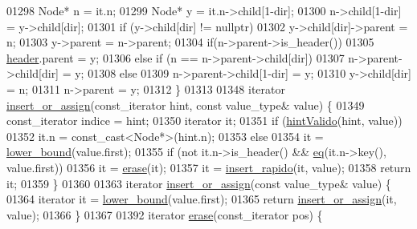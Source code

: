 \begin{DoxyCode}
01298         Node* n = it.n;
01299         Node* y = it.n->child[1-dir];
01300         n->child[1-dir] = y->child[dir];
01301         \textcolor{keywordflow}{if} (y->child[dir] != \textcolor{keyword}{nullptr})
01302             y->child[dir]->parent = n;
01303         y->parent = n->parent;
01304         \textcolor{keywordflow}{if}(n->parent->is\_header())
01305             \hyperlink{classaed2_1_1map_a92d93f905c8ad73fba18fdc7e8915cce_a92d93f905c8ad73fba18fdc7e8915cce}{header}.parent = y;
01306         \textcolor{keywordflow}{else} if (n == n->parent->child[dir])
01307             n->parent->child[dir] = y;
01308         \textcolor{keywordflow}{else}
01309             n->parent->child[1-dir] = y;
01310         y->child[dir] = n;
01311         n->parent = y;
01312     \}
01313 
01348     iterator \hyperlink{classaed2_1_1map_a2ef6723c183916276b0afc4a4c721475_a2ef6723c183916276b0afc4a4c721475}{insert_or_assign}(const\_iterator hint, \textcolor{keyword}{const} value\_type& value) \{
01349         const\_iterator indice = hint;
01350         iterator it;
01351         \textcolor{keywordflow}{if} (\hyperlink{classaed2_1_1map_a45b04533e9acf27438813ab4a2604443_a45b04533e9acf27438813ab4a2604443}{hintValido}(hint, value))
01352             it.n = \textcolor{keyword}{const\_cast<}Node*\textcolor{keyword}{>}(hint.n);
01353         \textcolor{keywordflow}{else}
01354             it = \hyperlink{classaed2_1_1map_a3399d36fdd5a880b494f3a5795d3f18f_a3399d36fdd5a880b494f3a5795d3f18f}{lower_bound}(value.first);
01355         \textcolor{keywordflow}{if} (not it.n->is\_header() && \hyperlink{classaed2_1_1map_ab45cb28bb215cd229383d88b96b3f624_ab45cb28bb215cd229383d88b96b3f624}{eq}(it.n->key(), value.first))
01356             it = \hyperlink{classaed2_1_1map_ad8e796bf9c9c558e5ce6b61e116253fe_ad8e796bf9c9c558e5ce6b61e116253fe}{erase}(it);
01357         it = \hyperlink{classaed2_1_1map_a4b4f1e65ee9aeccee4046d53fd5fd8a4_a4b4f1e65ee9aeccee4046d53fd5fd8a4}{insert_rapido}(it, value);
01358         \textcolor{keywordflow}{return} it;
01359     \}
01360 
01363     iterator \hyperlink{classaed2_1_1map_a2ef6723c183916276b0afc4a4c721475_a2ef6723c183916276b0afc4a4c721475}{insert_or_assign}(\textcolor{keyword}{const} value\_type& value) \{
01364         iterator it = \hyperlink{classaed2_1_1map_a3399d36fdd5a880b494f3a5795d3f18f_a3399d36fdd5a880b494f3a5795d3f18f}{lower_bound}(value.first);
01365         \textcolor{keywordflow}{return} \hyperlink{classaed2_1_1map_a2ef6723c183916276b0afc4a4c721475_a2ef6723c183916276b0afc4a4c721475}{insert_or_assign}(it, value);
01366     \}
01367 
01392     iterator \hyperlink{classaed2_1_1map_ad8e796bf9c9c558e5ce6b61e116253fe_ad8e796bf9c9c558e5ce6b61e116253fe}{erase}(const\_iterator pos) \{

\end{DoxyCode}

